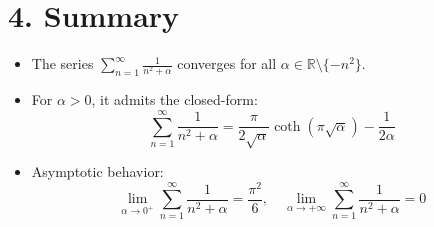 \documentclass[a4paper,11pt]{article}
\begin{document}
\section*{4. Summary}

\begin{itemize}
  \item The series \( \sum_{n=1}^{\infty} \frac{1}{n^2 + \alpha} \) converges for all \( \alpha \in \mathbb{R} \setminus \{-n^2\} \).
  \item For \( \alpha > 0 \), it admits the closed-form:
  \[
  \sum_{n=1}^{\infty} \frac{1}{n^2 + \alpha}
  = \frac{\pi}{2\sqrt{\alpha}} \coth(\pi \sqrt{\alpha}) - \frac{1}{2\alpha}
  \]
  \item Asymptotic behavior:
  \[
  \lim_{\alpha \to 0^+} \sum_{n=1}^{\infty} \frac{1}{n^2 + \alpha} = \frac{\pi^2}{6}, \quad
  \lim_{\alpha \to +\infty} \sum_{n=1}^{\infty} \frac{1}{n^2 + \alpha} = 0
  \]
\end{itemize}
\end{document}
